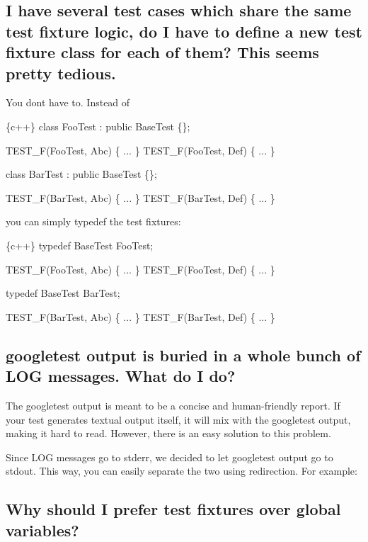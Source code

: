 \subsection*{I have several test cases which share the same test fixture logic, do I have to define a new test fixture class for each of them? This seems pretty tedious.}

You don\textquotesingle{}t have to. Instead of


\begin{DoxyCode}
\{c++\}
class FooTest : public BaseTest \{\};

TEST\_F(FooTest, Abc) \{ ... \}
TEST\_F(FooTest, Def) \{ ... \}

class BarTest : public BaseTest \{\};

TEST\_F(BarTest, Abc) \{ ... \}
TEST\_F(BarTest, Def) \{ ... \}
\end{DoxyCode}


you can simply {\ttfamily typedef} the test fixtures\+:


\begin{DoxyCode}
\{c++\}
typedef BaseTest FooTest;

TEST\_F(FooTest, Abc) \{ ... \}
TEST\_F(FooTest, Def) \{ ... \}

typedef BaseTest BarTest;

TEST\_F(BarTest, Abc) \{ ... \}
TEST\_F(BarTest, Def) \{ ... \}
\end{DoxyCode}


\subsection*{googletest output is buried in a whole bunch of L\+OG messages. What do I do?}

The googletest output is meant to be a concise and human-\/friendly report. If your test generates textual output itself, it will mix with the googletest output, making it hard to read. However, there is an easy solution to this problem.

Since {\ttfamily L\+OG} messages go to stderr, we decided to let googletest output go to stdout. This way, you can easily separate the two using redirection. For example\+:




\subsection*{Why should I prefer test fixtures over global variables?}

